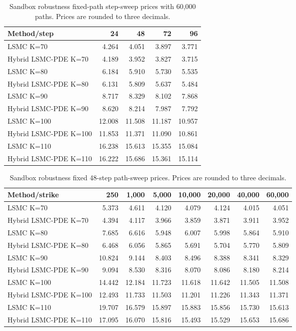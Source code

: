 \begin{table}[H]\centering
\caption{Sandbox robustness fixed-path step-sweep prices with 60,000 paths. Prices are rounded to three decimals.}
\begin{tabular}{lrrrr}
\toprule
Method/step & 24 & 48 & 72 & 96 \\
\midrule
LSMC K=70 & 4.264 & 4.051 & 3.897 & 3.771 \\
Hybrid LSMC-PDE K=70 & 4.189 & 3.952 & 3.827 & 3.715 \\
LSMC K=80 & 6.184 & 5.910 & 5.730 & 5.535 \\
Hybrid LSMC-PDE K=80 & 6.131 & 5.809 & 5.637 & 5.484 \\
LSMC K=90 & 8.717 & 8.329 & 8.102 & 7.868 \\
Hybrid LSMC-PDE K=90 & 8.620 & 8.214 & 7.987 & 7.792 \\
LSMC K=100 & 12.008 & 11.508 & 11.187 & 10.957 \\
Hybrid LSMC-PDE K=100 & 11.853 & 11.371 & 11.090 & 10.861 \\
LSMC K=110 & 16.238 & 15.613 & 15.355 & 15.084 \\
Hybrid LSMC-PDE K=110 & 16.222 & 15.686 & 15.361 & 15.114 \\
\bottomrule
\end{tabular}
\end{table}

\begin{table}[H]\centering
\caption{Sandbox robustness fixed 48-step path-sweep prices. Prices are rounded to three decimals.}
\begin{tabular}{lrrrrrrr}
\toprule
Method/strike & 250 & 1,000 & 5,000 & 10,000 & 20,000 & 40,000 & 60,000 \\
\midrule
LSMC K=70 & 5.373 & 4.611 & 4.120 & 4.079 & 4.124 & 4.015 & 4.051 \\
Hybrid LSMC-PDE K=70 & 4.394 & 4.117 & 3.966 & 3.859 & 3.871 & 3.911 & 3.952 \\
LSMC K=80 & 7.685 & 6.616 & 5.948 & 6.007 & 5.998 & 5.864 & 5.910 \\
Hybrid LSMC-PDE K=80 & 6.468 & 6.056 & 5.865 & 5.691 & 5.704 & 5.770 & 5.809 \\
LSMC K=90 & 10.824 & 9.144 & 8.403 & 8.496 & 8.388 & 8.341 & 8.329 \\
Hybrid LSMC-PDE K=90 & 9.094 & 8.530 & 8.316 & 8.070 & 8.086 & 8.180 & 8.214 \\
LSMC K=100 & 14.442 & 12.184 & 11.723 & 11.618 & 11.642 & 11.505 & 11.508 \\
Hybrid LSMC-PDE K=100 & 12.493 & 11.733 & 11.503 & 11.201 & 11.226 & 11.343 & 11.371 \\
LSMC K=110 & 19.707 & 16.579 & 15.897 & 15.883 & 15.856 & 15.730 & 15.613 \\
Hybrid LSMC-PDE K=110 & 17.095 & 16.070 & 15.816 & 15.493 & 15.529 & 15.653 & 15.686 \\
\bottomrule
\end{tabular}
\end{table}

